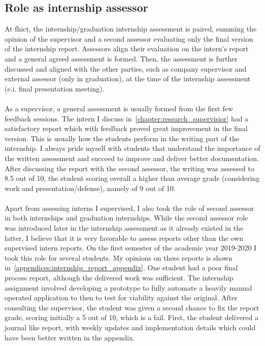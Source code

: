 \subsection{Role as internship assessor}\label{subsection:role_internship_assessor}
At \acrshort{fhict}, the internship/graduation internship assessment is paired, summing the opinion of the supervisor and a second assessor evaluating only the final version of the internship report. Assessors align their evaluation on the intern's report and a general agreed assessment is formed. Then, the assessment is further discussed and aligned with the other parties, such as company supervisor and external assessor (only in graduation), at the time of the internship assessment (e.i. final presentation meeting).
\\\\
As a supervisor, a general assessment is usually formed from the first few feedback sessions. The intern I discuss in~\cref{chapter:research_supervisior} had a satisfactory report which with feedback proved great improvement in the final version. This is usually how the students perform in the writing part of the internship. I always pride myself with students that understand the importance of the written assessment and succeed to improve and deliver better documentation. After discussing the report with the second assessor, the writing was assessed to 8.5 out of 10, the student scoring overall a higher than average grade (considering work and presentation/defense), namely of 9 out of 10.
\\\\
Apart from assessing interns I supervised, I also took the role of second assessor in both internships and graduation internships.
While the second assessor role was introduced later in the internship assessment as it already existed in the latter, I believe that it is very favorable to assess reports other than the own supervised intern reports.
On the first semester of the academic year 2019-2020 I took this role for several students. My opinions on these reports is shown in~\cref{appendices:internship_report_appendix}. One student had a poor final process report, although the delivered work was sufficient. 
The internship assignment involved developing a prototype to fully automate a heavily manual operated application to then to test for viability against the original. 
After consulting the supervisor, the student was given a second chance to fix the report grade, scoring initially a 5 out of 10, which is a fail. 
First, the student delivered a journal like report, with weekly updates and implementation details which could have been better written in the appendix. 
